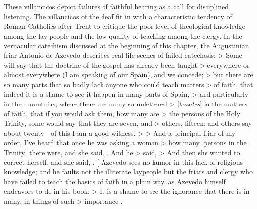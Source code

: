 These villancicos depict failures of faithful hearing as a call for disciplined listening.
The villancicos of the deaf fit in with a characteristic tendency of Roman Catholics after Trent to critique the poor level of theological knowledge among the lay people and the low quality of teaching among the clergy.
\Autocite[56--57]{Kamen:EarlyModernSociety}
In the vernacular catechism discussed at the beginning of this chapter, the Augustinian friar Antonio de Azevedo describes real-life scenes of failed catechesis:
> Some will say that the doctrine of the gospel has already been taught > everywhere or almost everywhere (I am speaking of our Spain), and we concede; > but there are so many parts that so badly lack anyone who could teach matters > of faith, that indeed it is a shame to see it happen in many parts of Spain, > and particularly in the mountains, where there are many so unlettered > [\emph{bozales}] in the matters of faith, that if you would ask them, how many are > the persons of the Holy Trinity, some would say that they are seven, and > others, fifteen; and others say about twenty---of this I am a good witness.
> > And a principal friar of my order, I've heard that once he was asking a woman > how many [persons in the Trinity] there were, and she said, . And he > said,  > And then she wanted to correct herself, and she said, .
[\Autocite[26:  .]{Azevedo:Catecismo}
   Azevedo sees no humor in this lack of religious knowledge; and he faults not the illiterate laypeople but the friars and clergy who have failed to teach the basics of faith in a plain way, as Azevedo himself endeavors to do in his book:
> It is a shame to see the ignorance that there is in many, in things of such > importance \Dots{}.
